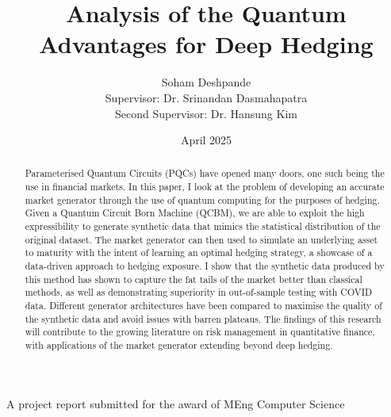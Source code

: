 \documentclass[12pt]{article}
\title{Analysis of the Quantum Advantages for Deep Hedging}
\author{Soham Deshpande\\Supervisor: Dr. Srinandan Dasmahapatra
\\Second Supervisor: Dr. Hansung Kim}
\date{April 2025}
\newcommand{\detailtexcount}[1]{%
  \immediate\write18{texcount -merge #1.tex > #1.wcdetail }%
}
\numberwithin{equation}{section}
\begin{document}
\maketitle
\vspace{10cm}
\begin{centering}
A project report submitted for the award of MEng Computer Science
\end{centering}
\thispagestyle{empty}







\clearpage


\begin{abstract}
Parameterised Quantum Circuits (PQCs) have opened many doors, one 
such being the use in financial markets. In this paper, I look at the problem 
of developing an accurate market generator through the use of quantum computing
for the purposes of hedging. 
Given a Quantum Circuit Born Machine (QCBM), we are able to exploit the high 
expressibility to generate synthetic 
data that mimics the statistical distribution of the original dataset. The market 
generator can then used to simulate an 
underlying asset to maturity with the intent of learning an optimal hedging strategy, 
a showcase of a data-driven approach to hedging exposure. I show that 
the synthetic 
data produced by this method has shown to capture the fat tails of the market 
better than classical methods, as well as demonstrating superiority in 
out-of-sample testing with COVID data. Different generator 
architectures have been compared to maximise the quality of the synthetic data 
and avoid issues with barren plateaus. 
The findings of 
this research will contribute to the growing literature on risk management in 
quantitative finance, with applications of the market generator extending beyond 
deep hedging. 
\end{abstract}

\clearpage


\tableofcontents
\clearpage



\end{document}
